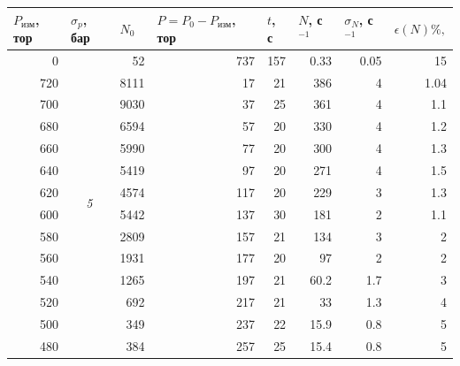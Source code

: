 \documentclass{article}
\begin{document}
\begin{table}[h!]
\centering
\begin{tabular}{|r|c|r|r|r|r|r|r|}
\hline
\multicolumn{1}{|l|}{$P_\text{изм}$, тор} &
  \multicolumn{1}{l|}{$\sigma_p$, бар} &
  \multicolumn{1}{l|}{$N_0$} &
  \multicolumn{1}{l|}{$P = P_0 - P_\text{изм}$, тор} &
  \multicolumn{1}{l|}{$t$, с} &
  \multicolumn{1}{l|}{$N$, с$^{-1}$} &
  \multicolumn{1}{l|}{$\sigma_{N}$, с$^{-1}$} &
  \multicolumn{1}{l|}{$\epsilon(N) \%,$} \\ \hline
0   & \multirow{20}{*}{\textit{5}} & 52   & 737 & 157 & 0.33 & 0.05 & 15   \\ \cline{1-1} \cline{3-8} 
720 &                              & 8111 & 17  & 21  & 386  & 4    & 1.04 \\ \cline{1-1} \cline{3-8} 
700 &                              & 9030 & 37  & 25  & 361  & 4    & 1.1  \\ \cline{1-1} \cline{3-8} 
680 &                              & 6594 & 57  & 20  & 330  & 4    & 1.2  \\ \cline{1-1} \cline{3-8} 
660 &                              & 5990 & 77  & 20  & 300  & 4    & 1.3  \\ \cline{1-1} \cline{3-8} 
640 &                              & 5419 & 97  & 20  & 271  & 4    & 1.5  \\ \cline{1-1} \cline{3-8} 
620 &                              & 4574 & 117 & 20  & 229  & 3    & 1.3  \\ \cline{1-1} \cline{3-8} 
600 &                              & 5442 & 137 & 30  & 181  & 2    & 1.1  \\ \cline{1-1} \cline{3-8} 
580 &                              & 2809 & 157 & 21  & 134  & 3    & 2    \\ \cline{1-1} \cline{3-8} 
560 &                              & 1931 & 177 & 20  & 97   & 2    & 2    \\ \cline{1-1} \cline{3-8} 
540 &                              & 1265 & 197 & 21  & 60.2 & 1.7  & 3    \\ \cline{1-1} \cline{3-8} 
520 &                              & 692  & 217 & 21  & 33   & 1.3  & 4    \\ \cline{1-1} \cline{3-8} 
500 &                              & 349  & 237 & 22  & 15.9 & 0.8  & 5    \\ \cline{1-1} \cline{3-8} 
480 &                              & 384  & 257 & 25  & 15.4 & 0.8  & 5    \\ \cline{1-1} \cline{3-8} 

\end{tabular}
\end{table}
\end{document}
